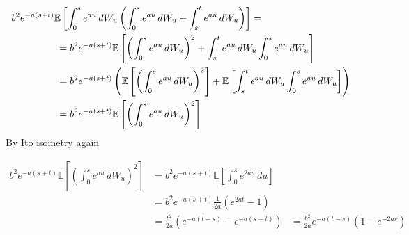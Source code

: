 \documentclass[a4paper,12pt]{article} %
\begin{document}
\begin{align*}
    b^2 e^{-a(s+t)} \mathbb{E} \left[ \int_0^{s} e^{au} \, dW_u \left( \int_0^s e^{au} \, dW_u + \int_s^t e^{au} \, dW_u \right) \right] & =                                                                                                                                                                                                    \\
                                                                                                                                         & \hspace{-7cm}= b^2 e^{-a(s+t)} \mathbb{E} \left[ \left(  \int_0^s e^{au} \, dW_u \right) ^2 + \int_s^t e^{au} \, dW_u  \int_0^{s} e^{au} \, dW_u  \right]                                            \\
                                                                                                                                         & \hspace{-7cm}= b^2 e^{-a(s+t)} \left(  \mathbb{E} \left[ \left(  \int_0^s e^{au} \, dW_u \right) ^2\right] +  \mathbb{E} \left[ \int_s^t e^{au} \, dW_u  \int_0^{s} e^{au} \, dW_u  \right]  \right) \\
                                                                                                                                         & \hspace{-7cm}= b^2 e^{-a(s+t)} \mathbb{E} \left[ \left(  \int_0^s e^{au} \, dW_u \right) ^2\right]                                                                                                   \\
\end{align*}
By Ito isometry again

\begin{align*}
    b^2 e^{-a(s+t)} \mathbb{E} \left[ \left(  \int_0^s e^{au} \, dW_u \right) ^2\right] & = b^2 e^{-a(s+t)} \mathbb{E} \left[\int_0^s e^{2au} \, du \right] \\
                                                                                        & =b^2 e^{-a(s+t)} \frac{1}{2a}\left( e^{2at}-1 \right)             \\
                                                                                        & = \frac{b^{2} }{2a}\left( e^{-a(t-s)} - e^{-a(s+t)} \right)
                                                                                        & = \frac{b^2}{2a} e^{-a(t-s)} \left( 1-e^{-2as} \right)
\end{align*}
\end{document}
